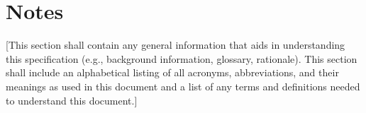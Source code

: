 \chapter{Notes\label{ref-033}}

[This section shall contain any general information that aids in understanding this specification (e.g., background information, glossary, rationale). This section shall include an alphabetical listing of all acronyms, abbreviations, and their meanings as used in this document and a list of any terms and definitions needed to understand this document.]